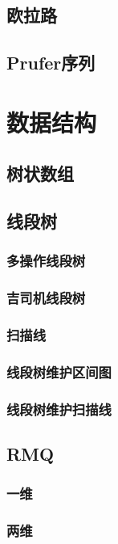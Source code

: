 \documentclass[twocolumn,a4]{article}
\newcommand{\addcpp}[1]{}
\begin{document}
	\subsection{欧拉路}
	\subsection{Prufer序列}

\section{数据结构}
	\subsection{树状数组}
	\subsection{线段树}
		\subsubsection{多操作线段树}
		\subsubsection{吉司机线段树}
		\subsubsection{扫描线}
		\subsubsection{线段树维护区间图}
			\addcpp{datastruct/interval_dij}
		\subsubsection{线段树维护扫描线}
			\addcpp{datastruct/scanline}
	\subsection{RMQ}
		\subsubsection{一维}
		\subsubsection{两维}
\end{document}
